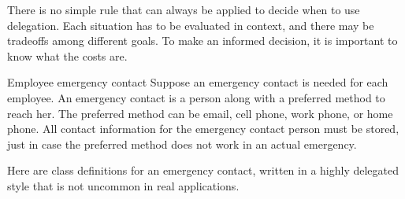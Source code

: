 There is no simple rule that can always be applied to decide when to use delegation. Each situation has to be evaluated in context, and there may be tradeoffs among different goals. To make an informed decision, it is important to know what the costs are.

\begin{example}{Employee emergency contact} 
Suppose an emergency contact is needed for each employee. An emergency contact is a person along with a preferred method to reach her.  The preferred method can be email, cell phone, work phone, or home phone. All contact information for the emergency contact person must be stored, just in case the preferred method does not work in an actual emergency. 
\end{example}
Here are class definitions for an emergency contact, written in a highly delegated style that is not uncommon in real applications. 

